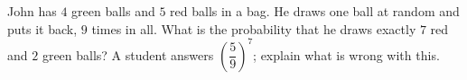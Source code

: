 John has $4$ green balls and $5$ red balls in a bag. He draws one ball at random and puts it back, $9$ times in all. What is the probability that he draws exactly $7$ red and $2$ green balls? A student answers $\left(\dfrac59\right)^7$; explain what is wrong with this.
